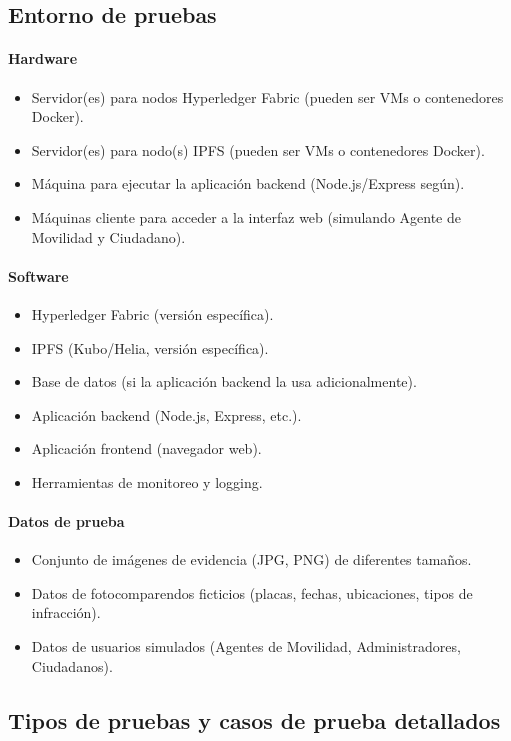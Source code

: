 \subsection{Entorno de pruebas}
\paragraph{Hardware}
\begin{itemize}
    \item Servidor(es) para nodos Hyperledger Fabric (pueden ser VMs o contenedores Docker). 
    \item Servidor(es) para nodo(s) IPFS (pueden ser VMs o contenedores Docker). 
    \item Máquina para ejecutar la aplicación backend (Node.js/Express según). 
    \item Máquinas cliente para acceder a la interfaz web (simulando Agente de Movilidad y Ciudadano).
\end{itemize}
\paragraph{Software}
\begin{itemize}
    \item Hyperledger Fabric (versión específica). 
    \item IPFS (Kubo/Helia, versión específica).
    \item Base de datos (si la aplicación backend la usa adicionalmente). 
    \item Aplicación backend (Node.js, Express, etc.).
        \item Aplicación frontend (navegador web). 
    \item Herramientas de monitoreo y logging.
\end{itemize}
\paragraph{Datos de prueba}
\begin{itemize}
    \item Conjunto de imágenes de evidencia (JPG, PNG) de diferentes tamaños. 
    \item Datos de fotocomparendos ficticios (placas, fechas, ubicaciones, tipos de infracción). 
    \item Datos de usuarios simulados (Agentes de Movilidad, Administradores, Ciudadanos).
\end{itemize}

\subsection{Tipos de pruebas y casos de prueba detallados}

